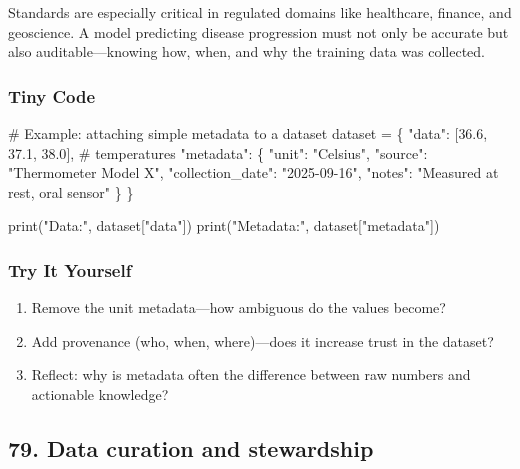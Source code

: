 \documentclass[
  letterpaper,
  DIV=11,
  numbers=noendperiod]{scrreprt}
\newenvironment{Shaded}{\begin{snugshade}}{\end{snugshade}}
\newcommand{\BuiltInTok}[1]{\textcolor[rgb]{0.00,0.23,0.31}{#1}}
\newcommand{\CommentTok}[1]{\textcolor[rgb]{0.37,0.37,0.37}{#1}}
\newcommand{\FloatTok}[1]{\textcolor[rgb]{0.68,0.00,0.00}{#1}}
\newcommand{\NormalTok}[1]{\textcolor[rgb]{0.00,0.23,0.31}{#1}}
\newcommand{\OperatorTok}[1]{\textcolor[rgb]{0.37,0.37,0.37}{#1}}
\newcommand{\StringTok}[1]{\textcolor[rgb]{0.13,0.47,0.30}{#1}}
\providecommand{\tightlist}{%
  \setlength{\itemsep}{0pt}\setlength{\parskip}{0pt}}
\begin{document}
Standards are especially critical in regulated domains like healthcare,
finance, and geoscience. A model predicting disease progression must not
only be accurate but also auditable---knowing how, when, and why the
training data was collected.

\subsubsection{Tiny Code}\label{tiny-code-77}

\begin{Shaded}
\begin{Highlighting}[]
\CommentTok{\# Example: attaching simple metadata to a dataset}
\NormalTok{dataset }\OperatorTok{=}\NormalTok{ \{}
    \StringTok{"data"}\NormalTok{: [}\FloatTok{36.6}\NormalTok{, }\FloatTok{37.1}\NormalTok{, }\FloatTok{38.0}\NormalTok{],  }\CommentTok{\# temperatures}
    \StringTok{"metadata"}\NormalTok{: \{}
        \StringTok{"unit"}\NormalTok{: }\StringTok{"Celsius"}\NormalTok{,}
        \StringTok{"source"}\NormalTok{: }\StringTok{"Thermometer Model X"}\NormalTok{,}
        \StringTok{"collection\_date"}\NormalTok{: }\StringTok{"2025{-}09{-}16"}\NormalTok{,}
        \StringTok{"notes"}\NormalTok{: }\StringTok{"Measured at rest, oral sensor"}
\NormalTok{    \}}
\NormalTok{\}}

\BuiltInTok{print}\NormalTok{(}\StringTok{"Data:"}\NormalTok{, dataset[}\StringTok{"data"}\NormalTok{])}
\BuiltInTok{print}\NormalTok{(}\StringTok{"Metadata:"}\NormalTok{, dataset[}\StringTok{"metadata"}\NormalTok{])}
\end{Highlighting}
\end{Shaded}

\subsubsection{Try It Yourself}\label{try-it-yourself-77}

\begin{enumerate}
\def\labelenumi{\arabic{enumi}.}
\tightlist
\item
  Remove the unit metadata---how ambiguous do the values become?
\item
  Add provenance (who, when, where)---does it increase trust in the
  dataset?
\item
  Reflect: why is metadata often the difference between raw numbers and
  actionable knowledge?
\end{enumerate}

\subsection{79. Data curation and
stewardship}\label{data-curation-and-stewardship}
\end{document}

